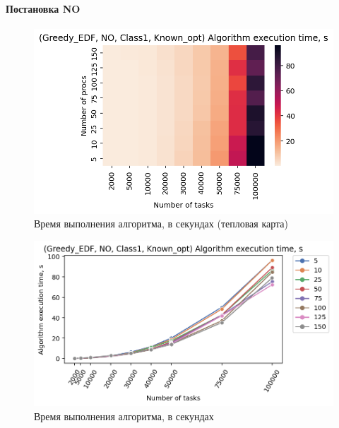 \paragraph{Постановка NO}

\begin{figure}[!htbp]
    \centering
    \includegraphics[width=\textwidth]{imgs/ideal_1/NO_EDF/et_heatmap.png}
    \caption{Время выполнения алгоритма, в секундах (тепловая карта)}
    \label{fig:NO-EDF-exec-time-heatmap}
\end{figure}

\begin{figure}[!htbp]
    \centering
    \includegraphics[width=\textwidth]{imgs/ideal_1/NO_EDF/tr_graph.png}
    \caption{Время выполнения алгоритма, в секундах}
    \label{fig:NO-EDF-exec-time-compiled}
\end{figure}

